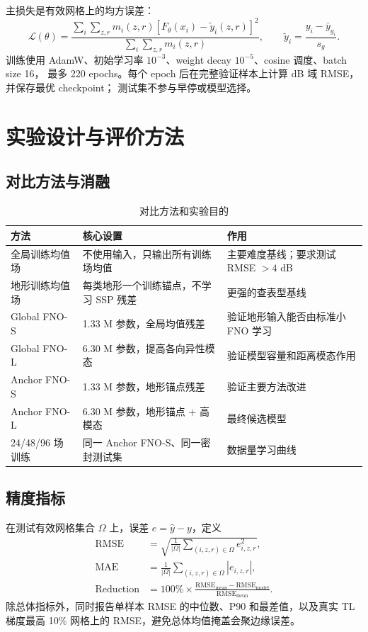 \documentclass[UTF8,11pt]{ctexart}
\newcommand{\RMSE}{\mathrm{RMSE}}
\begin{document}
主损失是有效网格上的均方误差：
\begin{equation}
  \mathcal{L}(\theta)=\frac{\sum_i\sum_{z,r}m_i(z,r)
  \left[F_\theta(x_i)-\tilde y_i(z,r)\right]^2}
  {\sum_i\sum_{z,r}m_i(z,r)},\qquad
  \tilde y_i=\frac{y_i-\bar y_{g_i}}{s_g}.
\end{equation}
训练使用 AdamW、初始学习率 $10^{-3}$、weight decay $10^{-5}$、cosine 调度、batch size 16，
最多 220 epochs。每个 epoch 后在完整验证样本上计算 dB 域 RMSE，并保存最优 checkpoint；
测试集不参与早停或模型选择。

\section{实验设计与评价方法}

\subsection{对比方法与消融}

\begin{table}[H]
\centering
\caption{对比方法和实验目的}
\begin{tabularx}{\textwidth}{L{3.3cm}L{3.6cm}Y}
\toprule
方法 & 核心设置 & 作用 \\
\midrule
全局训练均值场 & 不使用输入，只输出所有训练场均值 & 主要难度基线；要求测试 RMSE $>4$ dB \\
地形训练均值场 & 每类地形一个训练锚点，不学习 SSP 残差 & 更强的查表型基线 \\
Global FNO-S & 1.33 M 参数，全局均值残差 & 验证地形输入能否由标准小 FNO 学习 \\
Global FNO-L & 6.30 M 参数，提高各向异性模态 & 验证模型容量和距离模态作用 \\
Anchor FNO-S & 1.33 M 参数，地形锚点残差 & 验证主要方法改进 \\
Anchor FNO-L & 6.30 M 参数，地形锚点 + 高模态 & 最终候选模型 \\
24/48/96 场训练 & 同一 Anchor FNO-S、同一密封测试集 & 数据量学习曲线 \\
\bottomrule
\end{tabularx}
\end{table}

\subsection{精度指标}

在测试有效网格集合 $\Omega$ 上，误差 $e=\hat y-y$，定义
\begin{align}
  \RMSE &= \sqrt{\frac{1}{|\Omega|}\sum_{(i,z,r)\in\Omega}e_{i,z,r}^2},\\
  \mathrm{MAE} &= \frac{1}{|\Omega|}\sum_{(i,z,r)\in\Omega}|e_{i,z,r}|,\\
  \mathrm{Reduction} &=100\%\times\frac{\RMSE_{\mathrm{mean}}-\RMSE_{\mathrm{model}}}
  {\RMSE_{\mathrm{mean}}}.
\end{align}
除总体指标外，同时报告单样本 RMSE 的中位数、P90 和最差值，以及真实 TL 梯度最高
10\% 网格上的 RMSE，避免总体均值掩盖会聚边缘误差。
\end{document}
